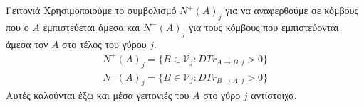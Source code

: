 {}
\begin{definitiongr}{Γειτονιά}
  \label{neighbourhood}
  Χρησιμοποιούμε το συμβολισμό $N^{+}\left(A\right)_j$ για να αναφερθούμε σε κόμβους που ο $A$ εμπιστεύεται άμεσα και
  $N^{-}\left(A\right)_j$ για τους κόμβους που εμπιστεύονται άμεσα τον $A$ στο τέλος του γύρου $j$.
  \begin{equation}
  \begin{gathered}
    N^{+}\left(A\right)_j = \{B \in \mathcal{V}_j : DTr_{A \rightarrow B, j} > 0\} \\
    N^{-}\left(A\right)_j = \{B \in \mathcal{V}_j : DTr_{B \rightarrow A, j} > 0\}
  \end{gathered}
  \end{equation}
  Αυτές καλούνται έξω και μέσα γειτονιές του $A$ στο γύρο $j$ αντίστοιχα.
\end{definitiongr}
